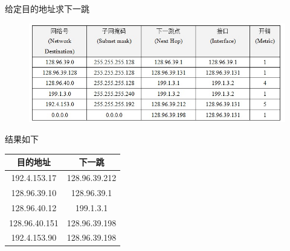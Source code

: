 \begin{example}
	给定目的地址求下一跳
\begin{figure}[H]
	\centering
	\includegraphics[width=0.8\linewidth]{fig/router_table_example.jpg}
\end{figure}
\end{example}
\begin{analysis}
	结果如下
	\begin{center}
		\begin{tabular}{cc}\hline
			目的地址 & 下一跳\\\hline
			192.4.153.17 & 128.96.39.212\\
			128.96.39.10 & 128.96.39.1\\
			128.96.40.12 & 199.1.3.1\\
			128.96.40.151 & 128.96.39.198\\
			192.4.153.90 & 128.96.39.198\\\hline
		\end{tabular}
	\end{center}
\end{analysis}

